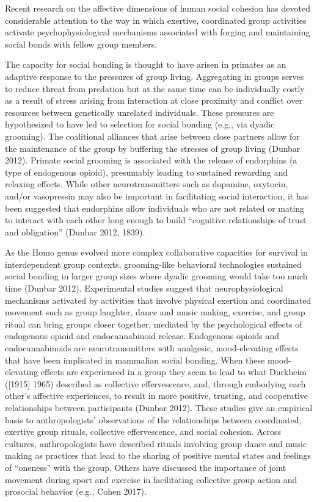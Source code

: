Recent research on the affective dimensions of human social cohesion has devoted considerable attention to the way in which exertive, coordinated group activities activate psychophysiological mechanisms associated with forging and maintaining social bonds with fellow group members.

The capacity for social bonding is thought to have arisen in primates as an adaptive response to the pressures of group living. Aggregating in groups serves to reduce threat from predation but at the same time can be individually costly as a result of stress arising from interaction at close proximity and conflict over resources between genetically unrelated individuals. These pressures are hypothesized to have led to selection for social bonding (e.g., via dyadic grooming). The coalitional alliances that arise between close partners allow for the maintenance of the group by buffering the stresses of group living (Dunbar 2012). Primate social grooming is associated with the release of endorphins (a type of endogenous opioid), presumably leading to sustained rewarding and relaxing effects. While other neurotransmitters such as dopamine, oxytocin, and/or vasopressin may also be important in facilitating social interaction, it has been suggested that endorphins allow individuals who are not related or mating to interact with each other long enough to build “cognitive relationships of trust and obligation” (Dunbar 2012, 1839).

As the Homo genus evolved more complex collaborative capacities for survival in interdependent group contexts, grooming-like behavioral technologies sustained social bonding in larger group sizes where dyadic grooming would take too much time (Dunbar 2012). Experimental studies suggest that neurophysiological mechanisms activated by activities that involve physical exertion and coordinated movement such as group laughter, dance and music making, exercise, and group ritual can bring groups closer together, mediated by the psychological effects of endogenous opioid and endocannabinoid release. Endogenous opioids and endocannabinoids are neurotransmitters with analgesic, mood-elevating effects that have been implicated in mammalian social bonding. When these mood-elevating effects are experienced in a group they seem to lead to what Durkheim ([1915] 1965) described as collective effervescence, and, through embodying each other’s affective experiences, to result in more positive, trusting, and cooperative relationships between participants (Dunbar 2012).
These studies give an empirical basis to anthropologists’ observations of the relationships between coordinated, exertive group rituals, collective effervescence, and social cohesion. Across cultures, anthropologists have described rituals involving group dance and music making as practices that lead to the sharing of positive mental states and feelings of “oneness” with the group. Others have discussed the importance of joint movement during sport and exercise in facilitating collective group action and prosocial behavior (e.g., Cohen 2017).

